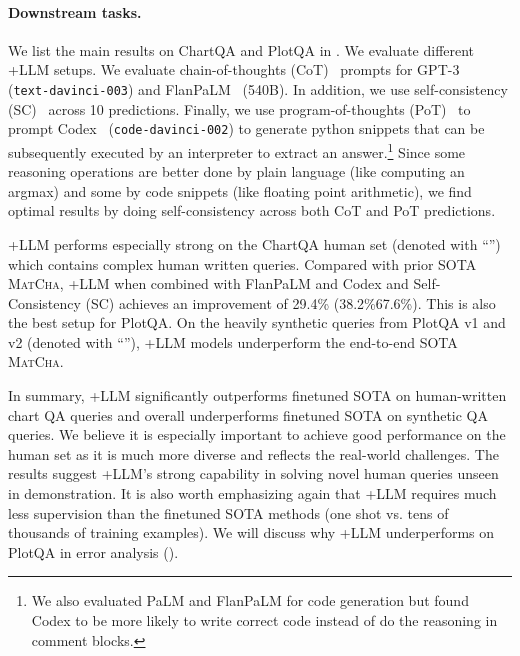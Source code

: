 \paragraph{Downstream tasks.} We list the main results on ChartQA \citep{masry-etal-2022-chartqa} and PlotQA \citep{methani2020plotqa}
in .
We evaluate different \model+LLM setups. We evaluate chain-of-thoughts (CoT)~\citep{wei2022cot} prompts for GPT-3~\cite{brown2020language} (\texttt{text-davinci-003}) and FlanPaLM~\cite{chung2022scaling} (540B). In addition, we use self-consistency (SC)~\cite{wang2022selfconsistency} across 10 predictions. Finally, we use program-of-thoughts (PoT)~\cite{chen2022program} to prompt Codex~\cite{chen2021codex} (\texttt{code-davinci-002}) to generate python snippets that can be subsequently executed by an interpreter to extract an answer.\footnote{We also evaluated PaLM and FlanPaLM for code generation but found Codex to be more likely to write correct code instead of do the reasoning in comment blocks.} Since some reasoning operations are better done by plain language (like computing an argmax) and some by code snippets (like floating point arithmetic), we find optimal results by doing self-consistency across both CoT and PoT predictions.

\model+LLM performs especially strong on the ChartQA human set (denoted with ``\colorbox{red!30}{}'') which contains complex human written queries. Compared with prior SOTA \textsc{MatCha}, \model+LLM when combined with FlanPaLM and Codex and Self-Consistency (SC) achieves an improvement of 29.4\% (38.2\%67.6\%). This is also the best setup for PlotQA. On the heavily synthetic queries from PlotQA v1 and v2 (denoted with ``\colorbox{blue!30}{}''), \model+LLM models underperform the end-to-end SOTA \textsc{MatCha}.





In summary, \model+LLM significantly outperforms finetuned SOTA on human-written chart QA queries and overall underperforms finetuned SOTA on synthetic QA queries.
We believe it is especially important to achieve good performance on the human set as it is much more diverse and reflects the real-world challenges. The results suggest \model+LLM's strong capability in solving novel human queries unseen in demonstration.
It is also worth emphasizing again that \model+LLM requires much less supervision than the finetuned SOTA methods (one shot vs. tens of thousands of training examples). We will discuss why \model+LLM underperforms on PlotQA in error analysis (). 


